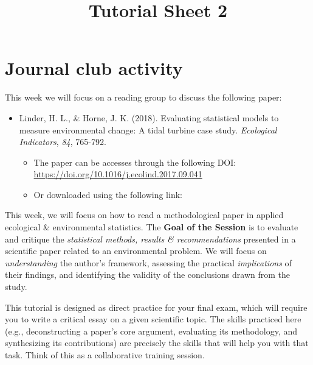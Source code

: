 \documentclass[
  letterpaper,
  DIV=11,
  numbers=noendperiod]{scrartcl}
\title{Tutorial Sheet 2}
\author{}
\date{}
\makeatletter
\providecommand{\tightlist}{%
  \setlength{\itemsep}{0pt}\setlength{\parskip}{0pt}}\usepackage{longtable,booktabs,array}
\renewcommand{\maketitle}{\bgroup\setlength{\parindent}{0pt}
\begin{flushleft}
  {\color{uniblue}\sffamily\huge\textbf{\@title}} \vspace{0.3cm} \newline
  {\Large {\@subtitle}} \newline
  \@author
\end{flushleft}\egroup
}
\makeatother
\begin{document}
\maketitle

\pagestyle{mystyle}


\section{Journal club activity}\label{journal-club-activity}

This week we will focus on a reading group to discuss the following
paper:

\begin{itemize}
\tightlist
\item
  Linder, H. L., \& Horne, J. K. (2018). Evaluating statistical models
  to measure environmental change: A tidal turbine case study.
  \emph{Ecological Indicators}, \emph{84}, 765-792.

  \begin{itemize}
  \tightlist
  \item
    The paper can be accesses through the following DOI:
    \url{https://doi.org/10.1016/j.ecolind.2017.09.041}
  \item
    Or downloaded using the following link:
  \end{itemize}
\end{itemize}

This week, we will focus on how to read a methodological paper in
applied ecological \& environmental statistics. The \textbf{Goal of the
Session} is to evaluate and critique the \emph{statistical methods,
results \& recommendations} presented in a scientific paper related to
an environmental problem. We will focus on \emph{understanding} the
author's framework, assessing the practical \emph{implications} of their
findings, and identifying the validity of the conclusions drawn from the
study.

\begin{tcolorbox}[enhanced jigsaw, opacitybacktitle=0.6, title=\textcolor{quarto-callout-note-color}{\faInfo}\hspace{0.5em}{Note}, breakable, colbacktitle=quarto-callout-note-color!10!white, opacityback=0, left=2mm, toptitle=1mm, rightrule=.15mm, bottomtitle=1mm, arc=.35mm, colframe=quarto-callout-note-color-frame, leftrule=.75mm, titlerule=0mm, bottomrule=.15mm, toprule=.15mm, colback=white, coltitle=black]

This tutorial is designed as direct practice for your final exam, which
will require you to write a critical essay on a given scientific topic.
The skills practiced here (e.g., deconstructing a paper's core argument,
evaluating its methodology, and synthesizing its contributions) are
precisely the skills that will help you with that task. Think of this as
a collaborative training session.

\end{tcolorbox}
\end{document}

